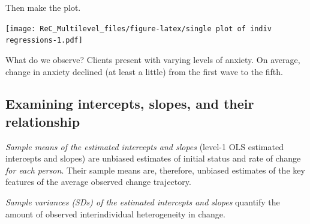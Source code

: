 \documentclass[
  english,
]{book}
\newenvironment{Shaded}{\begin{snugshade}}{\end{snugshade}}
\newcommand{\AttributeTok}[1]{\textcolor[rgb]{0.77,0.63,0.00}{#1}}
\newcommand{\CommentTok}[1]{\textcolor[rgb]{0.56,0.35,0.01}{\textit{#1}}}
\newcommand{\ControlFlowTok}[1]{\textcolor[rgb]{0.13,0.29,0.53}{\textbf{#1}}}
\newcommand{\FunctionTok}[1]{\textcolor[rgb]{0.00,0.00,0.00}{#1}}
\newcommand{\NormalTok}[1]{#1}
\newcommand{\OtherTok}[1]{\textcolor[rgb]{0.56,0.35,0.01}{#1}}
\newcommand{\SpecialCharTok}[1]{\textcolor[rgb]{0.00,0.00,0.00}{#1}}
\newcommand{\StringTok}[1]{\textcolor[rgb]{0.31,0.60,0.02}{#1}}
\begin{document}
\begin{Shaded}
\end{Shaded}

Then make the plot.

\begin{Shaded}
\end{Shaded}

\texttt{[image: ReC\_Multilevel\_files/figure-latex/single plot of indiv regressions-1.pdf]}

What do we observe? Clients present with varying levels of anxiety. On average, change in anxiety declined (at least a little) from the first wave to the fifth.

\hypertarget{examining-intercepts-slopes-and-their-relationship}{%
\subsection{Examining intercepts, slopes, and their relationship}\label{examining-intercepts-slopes-and-their-relationship}}

\emph{Sample means of the estimated intercepts and slopes} (level-1 OLS estimated intercepts and slopes) are unbiased estimates of initial status and rate of change \emph{for each person}. Their sample means are, therefore, unbiased estimates of the key features of the average observed change trajectory.

\emph{Sample variances (SDs) of the estimated intercepts and slopes} quantify the amount of observed interindividual heterogeneity in change.
\end{document}
